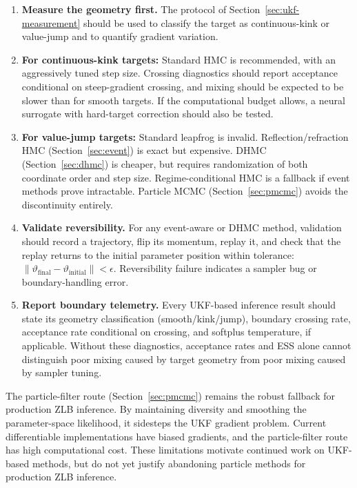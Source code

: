 \documentclass[11pt]{article}
\begin{document}
\begin{enumerate}
\item \textbf{Measure the geometry first.} The protocol of
      Section~\ref{sec:ukf-measurement} should be used to classify the target as
      continuous-kink or value-jump and to quantify gradient variation.
\item \textbf{For continuous-kink targets:} Standard HMC is recommended,
      with an aggressively tuned step size. Crossing diagnostics should report
      acceptance conditional on steep-gradient crossing, and mixing should be
      expected to be slower than for smooth targets. If the computational
      budget allows, a neural surrogate with hard-target correction should
      also be tested.
\item \textbf{For value-jump targets:} Standard leapfrog is invalid.
      Reflection/refraction HMC (Section~\ref{sec:event}) is exact but
      expensive. DHMC (Section~\ref{sec:dhmc}) is cheaper, but requires
      randomization of both coordinate order and step size. Regime-conditional
      HMC is a fallback if event methods prove intractable. Particle MCMC
      (Section~\ref{sec:pmcmc}) avoids the discontinuity entirely.
\item \textbf{Validate reversibility.} For any event-aware or DHMC method,
      validation should record a trajectory, flip its momentum, replay it,
      and check that the replay returns to the initial parameter position
      within tolerance:
      $\|\vartheta_{\text{final}} - \vartheta_{\text{initial}}\| < \epsilon$.
      Reversibility failure indicates a sampler bug or boundary-handling error.
\item \textbf{Report boundary telemetry.} Every UKF-based inference result
      should state its geometry classification (smooth/kink/jump), boundary
      crossing rate, acceptance rate conditional on crossing, and softplus
      temperature, if applicable. Without these diagnostics, acceptance rates
      and ESS alone cannot distinguish poor mixing caused by target geometry
      from poor mixing caused by sampler tuning.
\end{enumerate}

The particle-filter route (Section~\ref{sec:pmcmc}) remains the robust fallback
for production ZLB inference. By maintaining diversity and smoothing the
parameter-space likelihood, it sidesteps the UKF gradient problem. Current
differentiable implementations have biased gradients, and the particle-filter
route has high computational cost. These limitations motivate continued work
on UKF-based methods, but do not yet justify abandoning particle methods for
production ZLB inference.
\end{document}
